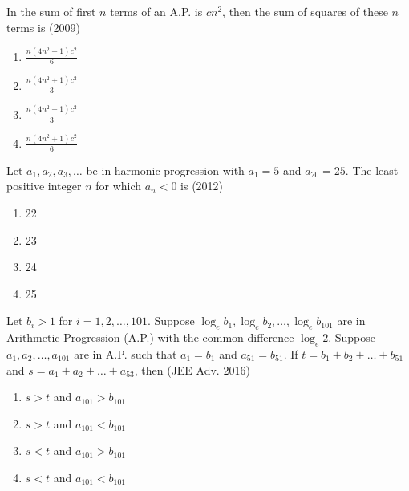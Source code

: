 \item In the sum of first $n$ terms of an A.P. is $cn^2$, then the sum of squares of these $n$ terms is \hfill(2009)
            \begin{multicols}{4}
                
            
             \begin{enumerate}
                    \item $\frac{n(4n^2-1)c^2}{6}$
                    \item $\frac{n(4n^2+1)c^2}{3}$
                    \item $\frac{n(4n^2-1)c^2}{3}$
                    \item $\frac{n(4n^2+1)c^2}{6}$
		\end{enumerate} 
         \end{multicols}
  
\item Let ${a_1,a_2,a_3,\dots}$ be in harmonic progression with ${a_1}=5$ and ${a_{20}}=25$. The least positive integer $n$ for which ${a_n<0}$ is \hfill(2012)
               \begin{multicols}{4}
                \begin{enumerate}
                    \item 22
                    \item 23
                    \item 24
                    \item 25
                    \end{enumerate}
                    \end{multicols}
\item Let ${b_i}>1$ for $i=1,2,\dots,101$. Suppose ${\log_e}{b_1},{\log_e}{b_2},\dots,{\log_e}{b_{101}}$ are in Arithmetic Progression (A.P.) with the common difference ${\log_e}2$. Suppose ${a_1,a_2,\dots,a_{101}}$ are in A.P. such that ${a_1=b_1}$ and ${a_{51}=b_{51}}$. If $t={b_1+b_2+\dots+b_{51}}$ and $s={a_1+a_2+\dots+a_{53}}$, then \hfill (JEE Adv. 2016)
                    \begin{multicols}{2}
                    \begin{enumerate}
                    
                        \item $s>t$ and ${a_{101}>b_{101}}$
                        \item $s>t$ and ${a_{101}<b_{101}}$
                        \item $s<t$ and ${a_{101}>b_{101}}$
                        \item $s<t$ and ${a_{101}<b_{101}}$
                        \end{enumerate}
                        \end{multicols}
    

